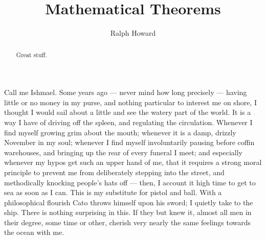 \documentclass{amsart}
\theoremstyle{definition}
\theoremstyle{remark}
\numberwithin{equation}{section}
\begin{document}

\title{Mathematical Theorems}


\author{Ralph Howard}
\address{Department of Mathematics, University of South Carolina, 
Columbia, SC 29208}





\begin{abstract}
Great stuff.
\end{abstract}







Call me Ishmael. Some years ago --- never mind how long precisely ---
having little or no money in my purse, and nothing particular to
interest me on shore, I thought I would sail about a little and see
the watery part of the world. It is a way I have of driving off the
spleen, and regulating the circulation.  Whenever I find myself
growing grim about the mouth; whenever it is a damp, drizzly November
in my soul; whenever I find myself involuntarily pausing before coffin
warehouses, and bringing up the rear of every funeral I meet; and
especially whenever my hypos get such an upper hand of me, that it
requires a strong moral principle to prevent me from deliberately
stepping into the street, and methodically knocking people's hats off
--- then, I account it high time to get to sea as soon as I can. This
is my substitute for pistol and ball. With a philosophical flourish
Cato throws himself upon his sword; I quietly take to the ship. There
is nothing surprising in this. If they but knew it, almost all men in
their degree, some time or other, cherish very nearly the same
feelings towards the ocean with me.
\end{document}
